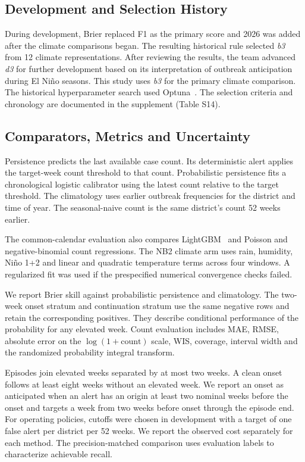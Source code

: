\documentclass[journal]{IEEEtran}
\newcommand{\bthree}{\textit{b3}}
\newcommand{\dthree}{\textit{d3}}
\begin{document}
\subsection{Development and Selection History}
During development, Brier replaced F1 as the primary score and 2026 was added after the climate comparisons began. The resulting historical rule selected \bthree{} from 12 climate representations. After reviewing the results, the team advanced \dthree{} for further development based on its interpretation of outbreak anticipation during El Ni\~no seasons. This study uses \bthree{} for the primary climate comparison. The historical hyperparameter search used Optuna~\cite{akiba2019}. The selection criteria and chronology are documented in the supplement (Table S14).

\subsection{Comparators, Metrics and Uncertainty}
Persistence predicts the last available case count. Its deterministic alert applies the target-week count threshold to that count. Probabilistic persistence fits a chronological logistic calibrator using the latest count relative to the target threshold. The climatology uses earlier outbreak frequencies for the district and time of year. The seasonal-naive count is the same district's count 52 weeks earlier.

The common-calendar evaluation also compares LightGBM~\cite{ke2017} and Poisson and negative-binomial count regressions. The NB2 climate arm uses rain, humidity, Ni\~no 1+2 and linear and quadratic temperature terms across four windows. A regularized fit was used if the prespecified numerical convergence checks failed.

We report Brier skill against probabilistic persistence and climatology. The two-week onset stratum and continuation stratum use the same negative rows and retain the corresponding positives. They describe conditional performance of the probability for any elevated week. Count evaluation includes MAE, RMSE, absolute error on the $\log(1+\text{count})$ scale, WIS, coverage, interval width and the randomized probability integral transform.

Episodes join elevated weeks separated by at most two weeks. A clean onset follows at least eight weeks without an elevated week. We report an onset as anticipated when an alert has an origin at least two nominal weeks before the onset and targets a week from two weeks before onset through the episode end. For operating policies, cutoffs were chosen in development with a target of one false alert per district per 52 weeks. We report the observed cost separately for each method. The precision-matched comparison uses evaluation labels to characterize achievable recall.
\end{document}
